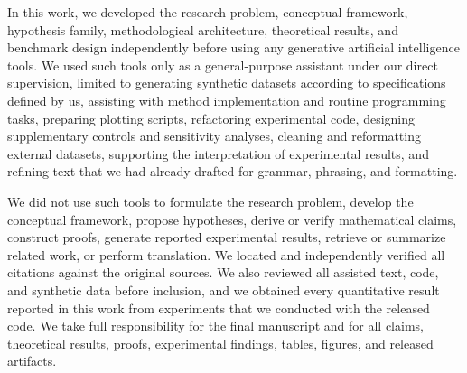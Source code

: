 \documentclass{article} %
\theoremstyle{defstyle}
\theoremstyle{plain}
\begin{document}
In this work, we developed the research problem, conceptual framework, hypothesis family,
methodological architecture, theoretical results, and benchmark design independently before
using any generative artificial intelligence tools. We used such tools only as a
general-purpose assistant under our direct supervision, limited to generating synthetic
datasets according to specifications defined by us, assisting with method implementation and
routine programming tasks, preparing plotting scripts, refactoring experimental code,
designing supplementary controls and sensitivity analyses, cleaning and reformatting external
datasets, supporting the interpretation of experimental results, and refining text that we
had already drafted for grammar, phrasing, and formatting.

We did not use such tools to formulate the research problem, develop the conceptual
framework, propose hypotheses, derive or verify mathematical claims, construct proofs,
generate reported experimental results, retrieve or summarize related work, or perform
translation. We located and independently verified all citations against the original
sources. We also reviewed all assisted text, code, and synthetic data before inclusion, and
we obtained every quantitative result reported in this work from experiments that we
conducted with the released code. We take full responsibility for the final manuscript and
for all claims, theoretical results, proofs, experimental findings, tables, figures, and
released artifacts.
\end{document}
